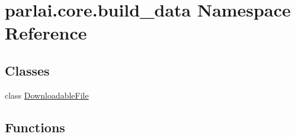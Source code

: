 \hypertarget{namespaceparlai_1_1core_1_1build__data}{}\section{parlai.\+core.\+build\+\_\+data Namespace Reference}
\label{namespaceparlai_1_1core_1_1build__data}
\subsection*{Classes}
\begin{DoxyCompactItemize}
\item 
class \hyperlink{classparlai_1_1core_1_1build__data_1_1DownloadableFile}{Downloadable\+File}
\end{DoxyCompactItemize}
\subsection*{Functions}
